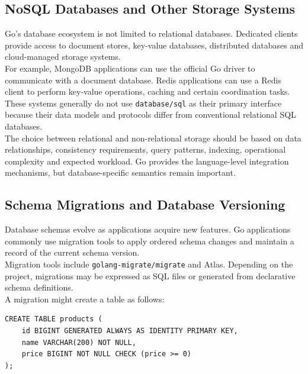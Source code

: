 \subsection{NoSQL Databases and Other Storage Systems}

Go's database ecosystem is not limited to relational databases. Dedicated clients provide access to document stores, key-value databases, distributed databases and cloud-managed storage systems.\\

For example, MongoDB applications can use the official Go driver to communicate with a document database. Redis applications can use a Redis client to perform key-value operations, caching and certain coordination tasks.\\

These systems generally do not use \texttt{database/sql} as their primary interface because their data models and protocols differ from conventional relational SQL databases.\\

The choice between relational and non-relational storage should be based on data relationships, consistency requirements, query patterns, indexing, operational complexity and expected workload. Go provides the language-level integration mechanisms, but database-specific semantics remain important.

\subsection{Schema Migrations and Database Versioning}

Database schemas evolve as applications acquire new features. Go applications commonly use migration tools to apply ordered schema changes and maintain a record of the current schema version.\\

Migration tools include \texttt{golang-migrate/migrate} and Atlas. Depending on the project, migrations may be expressed as SQL files or generated from declarative schema definitions.\\

A migration might create a table as follows:

\begin{lstlisting}
CREATE TABLE products (
    id BIGINT GENERATED ALWAYS AS IDENTITY PRIMARY KEY,
    name VARCHAR(200) NOT NULL,
    price BIGINT NOT NULL CHECK (price >= 0)
);
\end{lstlisting}

